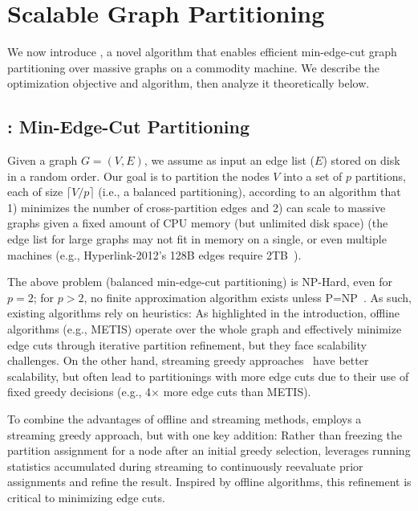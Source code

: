 \section{Scalable Graph Partitioning}
\label{sec:partitioning}



We now introduce \partitioning, a novel algorithm that enables efficient min-edge-cut graph partitioning over massive graphs on a commodity machine. We describe the optimization objective and algorithm, then analyze it theoretically below.



\subsection{\partitioning: Min-Edge-Cut Partitioning}
Given a graph $G = (V, E)$, we assume as input an edge list ($E$) stored on disk in a random order. Our goal is to partition the nodes $V$ into a set of $p$ partitions, each of size $\lceil V/p \rceil$ (i.e., a balanced partitioning), according to an algorithm that 1) minimizes the number of cross-partition edges and 2) can scale to massive graphs given a fixed amount of CPU memory (but unlimited disk space) (the edge list for large graphs may not fit in memory on a single, or even multiple machines (e.g., Hyperlink-2012's 128B edges require 2TB~\cite{hyperlink}).

The above problem (balanced min-edge-cut partitioning) is NP-Hard, even for $p=2$; for $p > 2$, no finite approximation algorithm exists unless P=NP~\cite{andreev2004balanced}. As such, existing algorithms rely on heuristics: As highlighted in the introduction, offline algorithms (e.g., METIS) operate over the whole graph and effectively minimize edge cuts through iterative partition refinement, but they face scalability challenges. On the other hand, streaming greedy approaches~\cite{stanton2014streaming, alistarh2015streaming, patwary2019window, stanton2012streaming, faraj2022buffered, petroni2015hdrf, jain1998greedy, tsourakakis2014fennel} have better scalability, but often lead to partitionings with more edge cuts due to their use of fixed greedy decisions (e.g., 4$\times$ more edge cuts than METIS).



To combine the advantages of offline and streaming methods, \partitioning employs a streaming greedy approach, but with one key addition: Rather than freezing the partition assignment for a node after an initial greedy selection, \partitioning leverages running statistics accumulated during streaming to continuously reevaluate prior assignments and refine the result. Inspired by offline algorithms, this refinement is critical to minimizing edge cuts.




